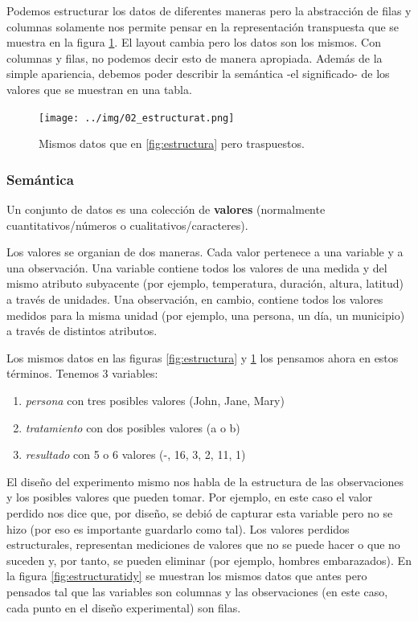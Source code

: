 \documentclass[]{article}
\begin{document}
Podemos estructurar los datos de diferentes maneras pero la abstracción
de filas y columnas solamente nos permite pensar en la representación
transpuesta que se muestra en la figura \ref{fig:estructurat}. El layout
cambia pero los datos son los mismos. Con columnas y filas, no podemos
decir esto de manera apropiada. Además de la simple apariencia, debemos
poder describir la semántica -el significado- de los valores que se
muestran en una tabla.

\begin{figure}[h]
    \centering
    \texttt{[image: ../img/02\_estructurat.png]}
    \caption{Mismos datos que en \ref{fig:estructura} pero traspuestos.}
    \label{fig:estructurat}
\end{figure}

\subsubsection{Semántica}\label{semantica}

Un conjunto de datos es una colección de \textbf{valores} (normalmente
cuantitativos/números o cualitativos/caracteres).

Los valores se organian de dos maneras. Cada valor pertenece a una
variable y a una observación. Una variable contiene todos los valores de
una medida y del mismo atributo subyacente (por ejemplo, temperatura,
duración, altura, latitud) a través de unidades. Una observación, en
cambio, contiene todos los valores medidos para la misma unidad (por
ejemplo, una persona, un día, un municipio) a través de distintos
atributos.

Los mismos datos en las figuras \ref{fig:estructura} y
\ref{fig:estructurat} los pensamos ahora en estos términos. Tenemos 3
variables:

\begin{enumerate}
\def\labelenumi{\arabic{enumi}.}
\itemsep1pt\parskip0pt
\item
  \emph{persona} con tres posibles valores (John, Jane, Mary)
\item
  \emph{tratamiento} con dos posibles valores (a o b)
\item
  \emph{resultado} con 5 o 6 valores (-, 16, 3, 2, 11, 1)
\end{enumerate}

El diseño del experimento mismo nos habla de la estructura de las
observaciones y los posibles valores que pueden tomar. Por ejemplo, en
este caso el valor perdido nos dice que, por diseño, se debió de
capturar esta variable pero no se hizo (por eso es importante guardarlo
como tal). Los valores perdidos estructurales, representan mediciones de
valores que no se puede hacer o que no suceden y, por tanto, se pueden
eliminar (por ejemplo, hombres embarazados). En la figura
\ref{fig:estructuratidy} se muestran los mismos datos que antes pero
pensados tal que las variables son columnas y las observaciones (en este
caso, cada punto en el diseño experimental) son filas.
\end{document}
